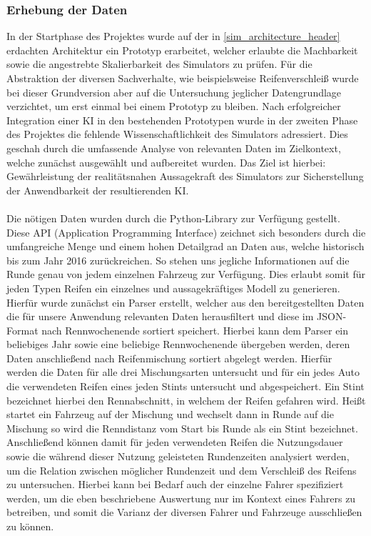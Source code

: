 \subsubsection{Erhebung der Daten}
In der Startphase des Projektes wurde auf der in \ref{sim_architecture_header} erdachten Architektur ein Prototyp erarbeitet, welcher erlaubte die Machbarkeit sowie die angestrebte Skalierbarkeit des Simulators zu prüfen. Für die Abstraktion der diversen Sachverhalte, wie beispielsweise Reifenverschleiß wurde bei dieser Grundversion aber auf die Untersuchung jeglicher Datengrundlage verzichtet, um erst einmal bei einem Prototyp zu bleiben. Nach erfolgreicher Integration einer KI in den bestehenden Prototypen wurde in der zweiten Phase des Projektes die fehlende Wissenschaftlichkeit des Simulators adressiert. Dies geschah durch die umfassende Analyse von relevanten Daten im Zielkontext, welche zunächst ausgewählt und aufbereitet wurden. Das Ziel ist hierbei: Gewährleistung der realitätsnahen Aussagekraft des Simulators zur Sicherstellung der Anwendbarkeit der resultierenden KI.
\\\\
Die nötigen Daten wurden durch die Python-Library  \cite{fast_f1} zur Verfügung gestellt. Diese API (Application Programming Interface) zeichnet sich besonders durch die umfangreiche Menge und einem hohen Detailgrad an Daten aus, welche historisch bis zum Jahr 2016 zurückreichen. So stehen uns jegliche Informationen auf die Runde genau von jedem einzelnen Fahrzeug zur Verfügung. Dies erlaubt somit für jeden Typen Reifen ein einzelnes und aussagekräftiges Modell zu generieren. Hierfür wurde zunächst ein Parser erstellt, welcher aus den bereitgestellten Daten die für unsere Anwendung relevanten Daten herausfiltert und diese im JSON-Format nach Rennwochenende sortiert speichert. Hierbei kann dem Parser ein beliebiges Jahr sowie eine beliebige Rennwochenende übergeben werden, deren Daten anschließend nach Reifenmischung sortiert abgelegt werden. Hierfür werden die Daten für alle drei Mischungsarten untersucht und für ein jedes Auto die verwendeten Reifen eines jeden Stints untersucht und abgespeichert. Ein Stint bezeichnet hierbei den Rennabschnitt, in welchem der Reifen gefahren wird. Heißt startet ein Fahrzeug auf der Mischung  und wechselt dann in Runde  auf die Mischung  so wird die Renndistanz vom Start bis Runde  als ein Stint bezeichnet. Anschließend können damit für jeden verwendeten Reifen die Nutzungsdauer sowie die während dieser Nutzung geleisteten Rundenzeiten analysiert werden, um die Relation zwischen möglicher Rundenzeit und dem Verschleiß des Reifens zu untersuchen. Hierbei kann bei Bedarf auch der einzelne Fahrer spezifiziert werden, um die eben beschriebene Auswertung nur im Kontext eines Fahrers zu betreiben, und somit die Varianz der diversen Fahrer und Fahrzeuge ausschließen zu können.\\
